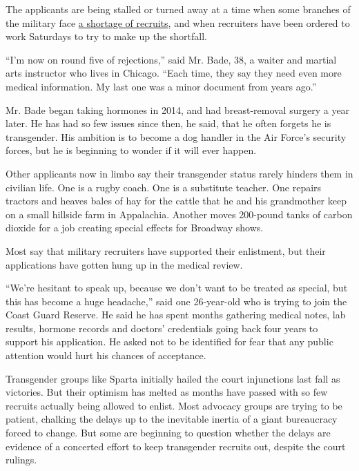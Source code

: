 The applicants are being stalled or turned away at a time when some
branches of the military face
\href{https://www.military.com/daily-news/2018/04/21/goal-80000-recruits-year-wont-be-met-army-secretary-says.html}{a
shortage of recruits}, and when recruiters have been ordered to work
Saturdays to try to make up the shortfall.

``I'm now on round five of rejections,'' said Mr. Bade, 38, a waiter and
martial arts instructor who lives in Chicago. ``Each time, they say they
need even more medical information. My last one was a minor document
from years ago.''

Mr. Bade began taking hormones in 2014, and had breast-removal surgery a
year later. He has had so few issues since then, he said, that he often
forgets he is transgender. His ambition is to become a dog handler in
the Air Force's security forces, but he is beginning to wonder if it
will ever happen.

Other applicants now in limbo say their transgender status rarely
hinders them in civilian life. One is a rugby coach. One is a substitute
teacher. One repairs tractors and heaves bales of hay for the cattle
that he and his grandmother keep on a small hillside farm in Appalachia.
Another moves 200-pound tanks of carbon dioxide for a job creating
special effects for Broadway shows.

Most say that military recruiters have supported their enlistment, but
their applications have gotten hung up in the medical review.

``We're hesitant to speak up, because we don't want to be treated as
special, but this has become a huge headache,'' said one 26-year-old who
is trying to join the Coast Guard Reserve. He said he has spent months
gathering medical notes, lab results, hormone records and doctors'
credentials going back four years to support his application. He asked
not to be identified for fear that any public attention would hurt his
chances of acceptance.

Transgender groups like Sparta initially hailed the court injunctions
last fall as victories. But their optimism has melted as months have
passed with so few recruits actually being allowed to enlist. Most
advocacy groups are trying to be patient, chalking the delays up to the
inevitable inertia of a giant bureaucracy forced to change. But some are
beginning to question whether the delays are evidence of a concerted
effort to keep transgender recruits out, despite the court rulings.

